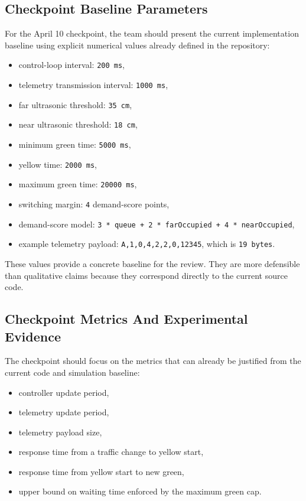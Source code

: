 \documentclass[11pt,a4paper]{article}
\begin{document}
\subsection{Checkpoint Baseline Parameters}

For the April 10 checkpoint, the team should present the current implementation baseline using explicit numerical values already defined in the repository:

\begin{itemize}
    \item control-loop interval: \texttt{200 ms},
    \item telemetry transmission interval: \texttt{1000 ms},
    \item far ultrasonic threshold: \texttt{35 cm},
    \item near ultrasonic threshold: \texttt{18 cm},
    \item minimum green time: \texttt{5000 ms},
    \item yellow time: \texttt{2000 ms},
    \item maximum green time: \texttt{20000 ms},
    \item switching margin: \texttt{4} demand-score points,
    \item demand-score model: \texttt{3 * queue + 2 * farOccupied + 4 * nearOccupied},
    \item example telemetry payload: \texttt{A,1,0,4,2,2,0,12345}, which is \texttt{19 bytes}.
\end{itemize}

These values provide a concrete baseline for the review. They are more defensible than qualitative claims because they correspond directly to the current source code.

\subsection{Checkpoint Metrics And Experimental Evidence}

The checkpoint should focus on the metrics that can already be justified from the current code and simulation baseline:

\begin{itemize}
    \item controller update period,
    \item telemetry update period,
    \item telemetry payload size,
    \item response time from a traffic change to yellow start,
    \item response time from yellow start to new green,
    \item upper bound on waiting time enforced by the maximum green cap.
\end{itemize}
\end{document}
